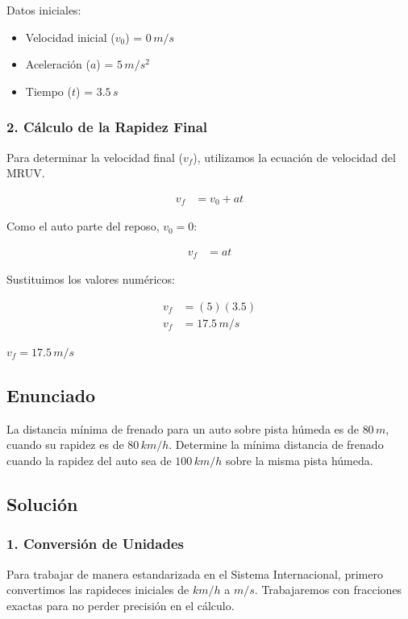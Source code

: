 \documentclass[12pt, a4paper]{article}
\begin{document}
Datos iniciales:
\begin{itemize}
\item Velocidad inicial ($v_0$) = $0 \, \si{m/s}$
\item Aceleración ($a$) = $5 \, \si{m/s^2}$
\item Tiempo ($t$) = $3.5 \, \si{s}$
\end{itemize}

\subsubsection*{2. Cálculo de la Rapidez Final}
Para determinar la velocidad final ($v_f$), utilizamos la ecuación de velocidad del MRUV.

\begin{align*}
v_f &= v_0 + a t
\end{align*}

Como el auto parte del reposo, $v_0 = 0$:

\begin{align*}
v_f &= a t
\end{align*}

Sustituimos los valores numéricos:

\begin{align*}
v_f &= (5) (3.5) \\
v_f &= 17.5 \, \si{m/s}
\end{align*}

\begin{tcolorbox}[colback=green!5!white, colframe=green!50!black, title=Respuesta Final]
\centering \Large $v_f = 17.5 \, \si{m/s}$
\end{tcolorbox}

\newpage

\subsection*{Enunciado}
La distancia mínima de frenado para un auto sobre pista húmeda es de $80 \, \si{m}$, cuando su rapidez es de $80 \, \si{km/h}$. Determine la mínima distancia de frenado cuando la rapidez del auto sea de $100 \, \si{km/h}$ sobre la misma pista húmeda.

\subsection*{Solución}

\subsubsection*{1. Conversión de Unidades}
Para trabajar de manera estandarizada en el Sistema Internacional, primero convertimos las rapideces iniciales de $\si{km/h}$ a $\si{m/s}$. Trabajaremos con fracciones exactas para no perder precisión en el cálculo.
\end{document}

